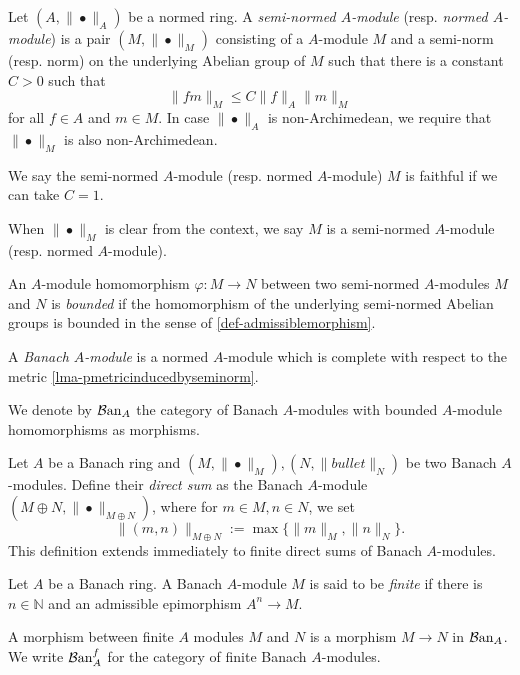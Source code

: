 \begin{definition}
    Let $(A,\|\bullet\|_A)$ be a normed ring. A \emph{semi-normed $A$-module} (resp. \emph{normed $A$-module}) is a pair $(M,\|\bullet\|_M)$ consisting of a $A$-module $M$ and a semi-norm (resp. norm) on the underlying Abelian group of $M$ such that there is a constant $C>0$ such that
    \[
      \|fm\|_M \leq C \|f\|_A \|m\|_M
    \]
    for all $f\in A$ and $m\in M$. In case $\|\bullet\|_A$ is non-Archimedean, we require that $\|\bullet\|_M$ is also non-Archimedean. 

    We say the semi-normed $A$-module (resp. normed $A$-module) $M$ is faithful if we can take $C=1$.

    When $\|\bullet\|_M$ is clear from the context, we say $M$ is a semi-normed $A$-module (resp. normed $A$-module).

    An $A$-module homomorphism $\varphi:M\rightarrow N$ between two semi-normed $A$-modules $M$ and $N$ is \emph{bounded} if the homomorphism of the underlying semi-normed Abelian groups is bounded in the sense of \cref{def-admissiblemorphism}.

    A \emph{Banach $A$-module} is a normed $A$-module which is complete with respect to the metric \cref{lma-pmetricinducedbyseminorm}.

    We denote by $\mathcal{B}\mathrm{an}_A$ the category of Banach $A$-modules with bounded $A$-module homomorphisms as morphisms.
\end{definition}

\begin{definition}
    Let $A$ be a Banach ring and $(M,\|\bullet\|_M),(N,\|bullet\|_N)$ be two Banach $A$-modules. Define their \emph{direct sum} as the Banach $A$-module $(M\oplus N, \|\bullet\|_{M\oplus N})$, where for $m\in M, n\in N$, we set
    \[
        \|(m,n)\|_{M\oplus N}:=\max\{\|m\|_M,\|n\|_N \}.  
    \]
    This definition extends immediately to finite direct sums of Banach $A$-modules.
\end{definition}



\begin{definition}\label{def-finiteBanachmodules}
    Let $A$ be a Banach ring. A Banach $A$-module $M$ is said to be \emph{finite} if there is $n\in \mathbb{N}$ and an admissible epimorphism $A^n\rightarrow M$. 

    A morphism between finite $A$ modules $M$ and $N$  is a morphism $M\rightarrow N$ in $\mathcal{B}\mathrm{an}_A$. We write $\mathcal{B}\mathrm{an}_A^f$ for the category of finite Banach $A$-modules.
\end{definition}

